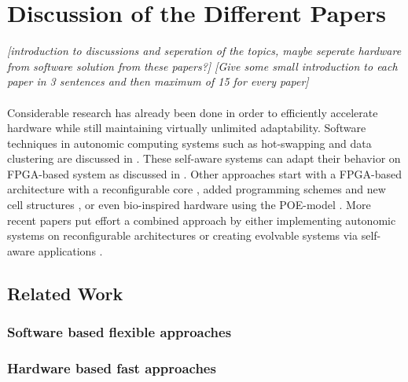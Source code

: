 
\section{Discussion of the Different Papers}
\label{sec:discussion}

\emph{[introduction to discussions and seperation of the topics, maybe seperate hardware from software solution from these papers?]
[Give some small introduction to each paper in 3 sentences and then maximum of 15 for every paper]}
\\
\\
Considerable research has already been done in order to efficiently accelerate hardware while still maintaining virtually unlimited adaptability. 
Software techniques in autonomic computing systems such as hot-swapping and data clustering are discussed in \cite{survey}. 
These self-aware systems can adapt their behavior on FPGA-based system as discussed in \cite{selfaware}.
Other approaches start with a FPGA-based architecture with a reconfigurable core \cite{drp},  added programming schemes and new cell structures \cite{virtex4}, \cite{erlangen} or even bio-inspired hardware using the POE-model \cite{poe}.
More recent papers put effort a combined approach by either implementing autonomic systems on reconfigurable architectures \cite{reconfigurable} or creating evolvable systems via self-aware applications \cite{evolvable}.

\subsection{Related Work}

\subsubsection{Software based flexible approaches}
\label{sec:software}



\subsubsection{Hardware based fast approaches}
\label{sec:hardware}


